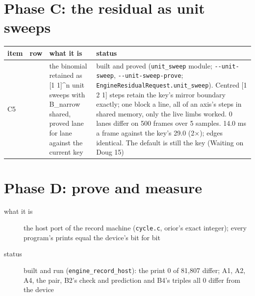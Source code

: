 \section{\texorpdfstring{Phase C: the residual as unit sweeps}{Phase C: the residual as unit sweeps}}

{\footnotesize
\setlength{\tabcolsep}{6pt}
\begin{longtable}{>{\RaggedRight\arraybackslash}p{}>{\RaggedRight\arraybackslash}p{}>{\RaggedRight\arraybackslash}p{}>{\RaggedRight\arraybackslash}p{}}
\toprule
item & row & what it is & status \\
\midrule
\endhead
C5 & 3 & the binomial retained as [1 1]\textasciicircum{}n unit sweeps with B\_\allowbreak{}narrow shared, proved lane for lane against the current key & built and proved (\texttt{unit\_\allowbreak{}sweep} module; \texttt{-\allowbreak{}-\allowbreak{}unit-\allowbreak{}sweep}, \texttt{-\allowbreak{}-\allowbreak{}unit-\allowbreak{}sweep-\allowbreak{}prove}; \texttt{Engine\allowbreak{}Residual\allowbreak{}Request.\allowbreak{}unit\_\allowbreak{}sweep}). Centred [1 2 1] steps retain the key's mirror boundary exactly; one block a line, all of an axis's steps in shared memory, only the live limbs worked. 0 lanes differ on 500 frames over 5 samples. 14.0 ms a frame against the key's 29.0 (2×); edges identical. The default is still the key (Waiting on Doug 15) \\
\bottomrule
\end{longtable}
}

\section{\texorpdfstring{Phase D: prove and measure}{Phase D: prove and measure}}

\begin{description}
\item[{what it is}] the host port of the record machine (\texttt{cycle.\allowbreak{}c}, orior's exact integer); every program's prints equal the device's bit for bit
\item[{status}] built and run (\texttt{engine\_\allowbreak{}record\_\allowbreak{}host}): the print 0 of 81,807 differ; A1, A2, A4, the pair, B2's check and prediction and B4's triples all 0 differ from the device
\end{description}

